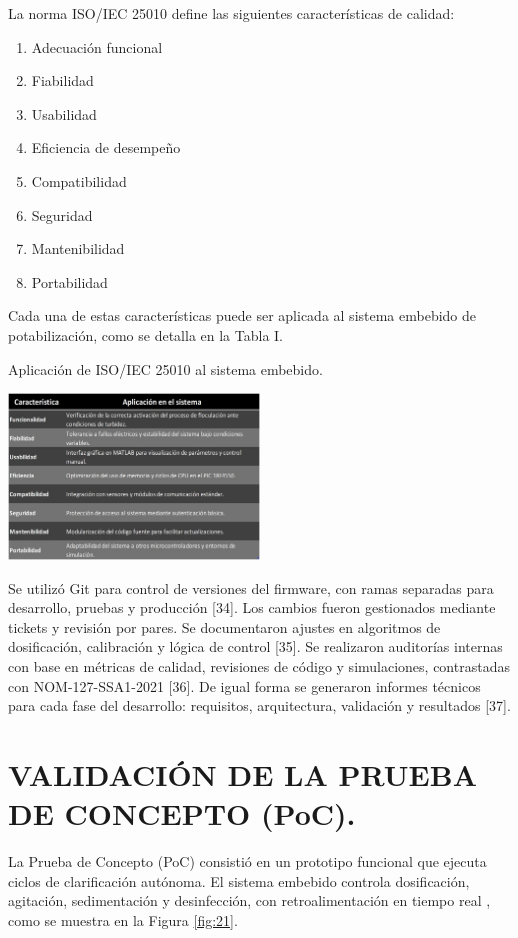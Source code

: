\documentclass[conference]{IEEEtran}
\begin{document}
La norma ISO/IEC 25010 define las siguientes características de calidad:

\begin{enumerate}
	\item Adecuación funcional
	\item Fiabilidad
	\item Usabilidad
	\item Eficiencia de desempeño
	\item Compatibilidad
	\item Seguridad
	\item Mantenibilidad
	\item Portabilidad
\end{enumerate}

Cada una de estas características puede ser aplicada al sistema embebido de potabilización, como se detalla en la Tabla I.



\begin{table}[h]
	\centering
	\caption{Aplicación de ISO/IEC 25010 al sistema embebido.}
	\includegraphics[width=0.5\textwidth]{tabla01.jpg}
	\label{tab:tabla01}
\end{table}

Se utilizó Git para control de versiones del firmware, con ramas separadas para desarrollo, pruebas y producción [34]. Los cambios fueron gestionados mediante tickets y revisión por pares. Se documentaron ajustes en algoritmos de dosificación, calibración y lógica de control [35]. Se realizaron auditorías internas con base en métricas de calidad, revisiones de código y simulaciones, contrastadas con NOM-127-SSA1-2021 [36].  De igual forma se generaron informes técnicos para cada fase del desarrollo: requisitos, arquitectura, validación y resultados [37].


\section{VALIDACIÓN DE LA PRUEBA DE CONCEPTO (PoC).}

La Prueba de Concepto (PoC) consistió en un prototipo funcional que ejecuta ciclos 
de clarificación autónoma. El sistema embebido controla dosificación, agitación, 
sedimentación y desinfección, con retroalimentación en tiempo real \cite{b38}, 
como se muestra en la Figura \ref{fig:21}.
\end{document}
